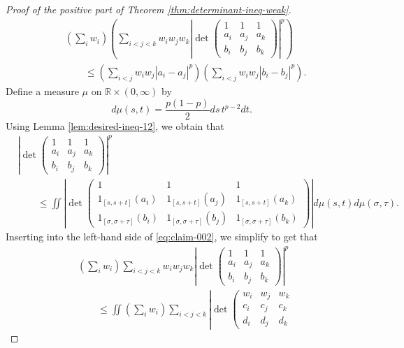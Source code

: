 \documentclass[11pt,a4paper]{amsart}
\theoremstyle{plain}
\theoremstyle{definition}
\newcommand{\R}{\mathbb R}
\begin{document}
\begin{proof}[Proof of the positive part of Theorem \ref{thm:determinant-ineq-weak}]
\begin{equation}
\begin{split}
    &\left(\sum_{i}w_i\right) 
    \left(\sum_{i<j<k} w_iw_jw_k \left|\operatorname{det}\left(\begin{array}{ccc} 1 & 1 & 1 \\ a_i & a_j & a_k \\ b_i & b_j & b_k\end{array}\right)\right|^p\right)
    \\
    &\qquad\leq
    \left(\sum_{ i<j} w_iw_j \left|a_i-a_j\right|^p\right) \left(\sum_{i<j} w_iw_j \left|b_i-b_j\right|^p\right).
    \end{split} \label{eq:claim-002}
    \end{equation}
    Define a measure $\mu$ on $\R \times (0,\infty)$ by 
    $$
        d \mu (s,t) = \frac{p(1-p)}{2} d s \, t^{p-2} d t.
    $$ 
    Using Lemma \ref{lem:desired-ineq-12}, we obtain that
     \begin{equation} 
        \begin{split}
        &\left|\operatorname{det}\left(\begin{array}{ccc}1 & 1 & 1 \\ a_i & a_j & a_k \\ b_i & b_j & b_k\end{array}\right)\right|^p  
        \\
        &\qquad \leq
        \iint\left|\operatorname{det}\left(\begin{array}{ccc}1 & 1 & 1 \\ 1_{[s,s+t]}(a_i) & 1_{[s,s+t]}(a_j) & 1_{[s,s+t]}(a_k) \\ 1_{[\sigma,\sigma+\tau]}(b_i) & 1_{[\sigma,\sigma+\tau]}(b_j) & 1_{[\sigma,\sigma+\tau]}(b_k)
        \end{array}\right)\right| d \mu(s, t) d \mu(\sigma, \tau).
        \end{split}
    \end{equation}
    Inserting into the left-hand side of \eqref{eq:claim-002}, we simplify to get that
    \begin{align}
        &\left(\sum_{i }w_i\right)  \sum_{i<j<k} w_iw_jw_k \left|\operatorname{det}\left(\begin{array}{ccc} 1 & 1 & 1 \\ a_i & a_j & a_k \\ b_i & b_j & b_k\end{array}\right)\right|^p
        \\
        &\qquad \leq
        \iint
        \left(\sum_{i}w_i\right)  \sum_{i<j<k}  \left|\operatorname{det}\left(\begin{array}{ccc}w_i & w_j & w_k \\ c_i  & c_j  & c_k  \\ d_i & d_j & d_k

\end{array}
\end{align}
\end{proof}
\end{document}

